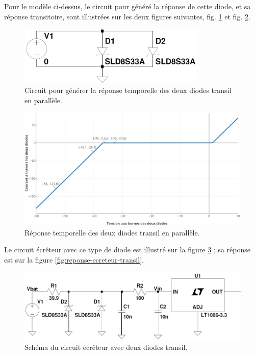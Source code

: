 Pour le modèle ci-dessus, le circuit pour généré la réponse de cette diode, et sa réponse transitoire, sont illustrées sur les deux figures suivantes, fig. \ref{fig:circuit-courbe-transil} et fig. \ref{fig:reponse-diode-transil}.

\begin{figure}[H]
    \centering
    \includegraphics[width=0.80\textwidth]{images/circuit-courbe-transil}
    \caption{Circuit pour générer la réponse temporelle des deux diodes transil en parallèle.}
    \label{fig:circuit-courbe-transil}
\end{figure}

\begin{figure}[H]
    \centering
    \includegraphics[width=1.00\textwidth]{images/reponse-diode-transil}
    \caption{Réponse temporelle des deux diodes transil en parallèle.}
    \label{fig:reponse-diode-transil}
\end{figure}

Le circuit écrêteur avec ce type de diode est illustré sur la figure \ref{fig:regulateur-transil} ; sa réponse est sur la figure \ref{fig:reponse-ecreteur-transil}.

\begin{figure}[H]
    \centering
    \includegraphics[width=1.00\textwidth]{images/regulateur-transil}
    \caption{Schéma du circuit écrêteur avec deux diodes transil.}
    \label{fig:regulateur-transil}
\end{figure}

